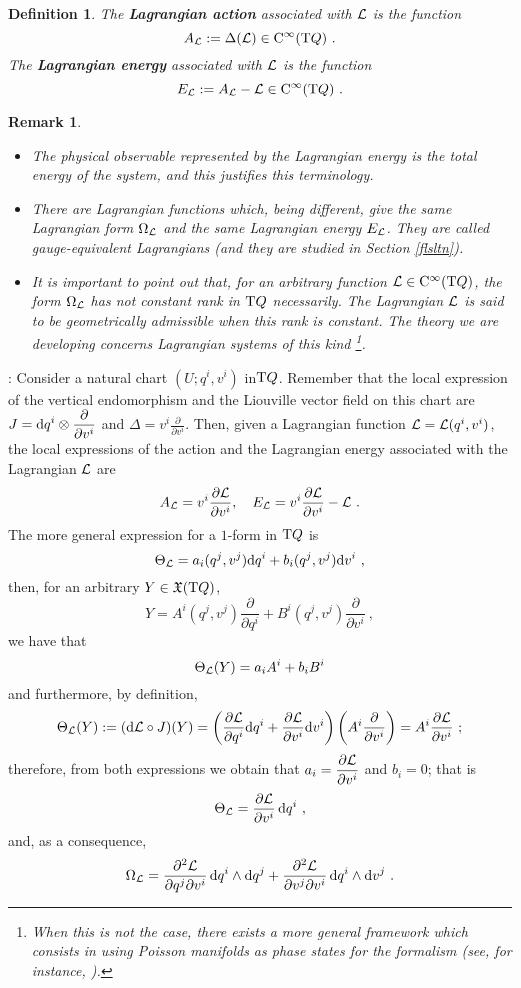 \documentclass[12pt]{report}
\newtheorem{definition}[teor]{Definition}
\newtheorem{remark}[teor]{Remark}
\def\dst{\displaystyle}
\def\derpar#1#2{\frac{\partial{#1}}{\partial{#2}}}
\def\vf{\mathfrak X}
\def\Lag{{\cal L}}
\def\d{{\rm d}}
\def\Tan{{\rm T}}
\def\Cinfty{{\rm C}^\infty}
\begin{document}
\begin{definition}
The \textbf{Lagrangian action} associated with $\Lag$ is the function
$$
A_\Lag := \Delta (\Lag ) \in \Cinfty (\Tan Q) \ .
$$
The \textbf{Lagrangian energy} associated with $\Lag$ is the function
$$
E_\Lag := A_\Lag - \Lag \in \Cinfty (\Tan Q) \ .
$$
\end{definition}

\begin{remark}{\rm 
\begin{itemize}
\item
The physical observable represented by the Lagrangian energy 
is the total energy of the system, and this justifies this terminology. 
\item
There are Lagrangian functions which, being different, give the same
Lagrangian form $\Omega_{\Lag}$ and the same Lagrangian energy $ E_{\Lag}$.
They are called {\sl gauge-equivalent Lagrangians} (and they are studied in Section \ref{flsltn}).
\item
It is important to point out that, for an arbitrary function
$\Lag \in \Cinfty (\Tan Q)$, the form $\Omega_\Lag$
has not constant rank in $\Tan Q$ necessarily.
The Lagrangian $\Lag$ is said to be {\sl  geometrically admissible}
when this rank is constant.
The theory we are developing concerns Lagrangian systems of this kind
\footnote{
When this is not the case,
there exists a more general framework which consists in using {\sl Poisson manifolds} as phase states for the formalism (see, for instance, \cite{LM-sgam}).
}.
\end{itemize}
}\end{remark}

:
Consider a natural  chart $(U;q^i,v^i)$ in$\Tan Q$.
Remember that the local expression of the vertical endomorphism and 
the Liouville vector field on this chart are
$\displaystyle J = \d q^i\otimes \derpar{}{v^i}$ and
$\displaystyle \Delta = v^i\derpar{}{v^i}$. Then,
given a Lagrangian function $\Lag=\Lag (q^i,v^i)$,
the local expressions of the action and the Lagrangian energy associated with the Lagrangian $\Lag$ are 
$$
A_\Lag = v^i\derpar{\Lag}{v^i}
,\quad
E_\Lag = v^i\derpar{\Lag}{v^i} - \Lag \ .
$$
The more general expression for a $1$-form in $\Tan Q$ is
$$
\Theta_\Lag = a_i(q^j,v^j) \d q^i + b_i(q^j,v^j) \d v^i \ ,
$$
then, for an arbitrary $Y\in\vf (\Tan Q)$,
$$
Y = A^i(q^j,v^j) \derpar{}{q^i} + B^i(q^j,v^j) \derpar{}{v^i} \ ,
$$
we have that
$$
\Theta_\Lag (Y) = a_iA^i +b_iB^i
$$
and furthermore, by definition,
$$
\Theta_\Lag (Y) := (\d \Lag \circ J)(Y) =
\left(\derpar{\Lag}{q^i}\d q^i + \derpar{\Lag}{v^i}\d v^i\right)
\left(A^i\derpar{}{v^i}\right)
=A^i \derpar{\Lag}{v^i} \ ;
$$
therefore, from both expressions we obtain that
\(\dst a_i = \derpar{\Lag}{v^i}\) and $b_i = 0$; that is
$$
\Theta_\Lag  = \derpar{\Lag}{v^i}\,\d q^i \ ,
$$
and, as a consequence,
$$
\Omega_\Lag  =
\frac{\partial^2\Lag}{\partial q^j \partial v^i}\, \d q^i \wedge \d q^j +
\frac{\partial^2\Lag}{\partial v^j \partial v^i}\, \d q^i \wedge \d v^j \ .
$$
\end{document}

